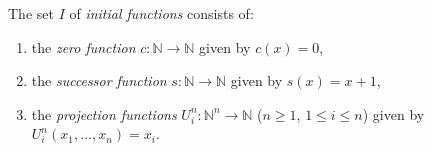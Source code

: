 The set $I$ of \textit{initial functions} consists of:

\begin{enumerate}
  \item[(i)] the \textit{zero function} $c: \mathbb{N} \to \mathbb{N}$ given by $c(x) = 0$,
  \item[(ii)] the \textit{successor function} $s: \mathbb{N} \to \mathbb{N}$ given by $s(x) = x + 1$,
  \item[(iii)] the \textit{projection functions} $U_i^n: \mathbb{N}^n \to \mathbb{N}$ ($n \geq 1$, $1 \leq i \leq n$) given by $U_i^n(x_1, \ldots, x_n) = x_i$.
\end{enumerate}
